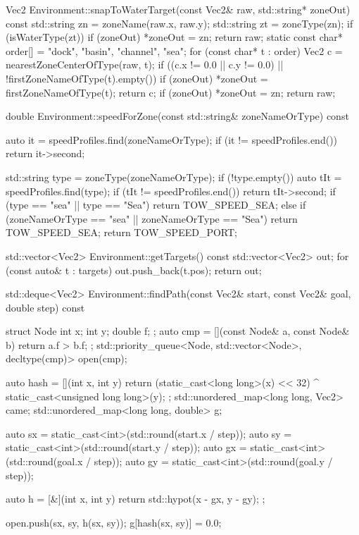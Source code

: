 \documentclass[10pt,letterpaper]{jsarticle}
\begin{document}
\begin{cppcode}
Vec2 Environment::snapToWaterTarget(const Vec2& raw, std::string* zoneOut) const {
    std::string zn = zoneName(raw.x, raw.y);
    std::string zt = zoneType(zn);
    if (isWaterType(zt)) {
        if (zoneOut) *zoneOut = zn;
        return raw;
    }
    static const char* order[] = {"dock", "basin", "channel", "sea"};
    for (const char* t : order) {
        Vec2 c = nearestZoneCenterOfType(raw, t);
        if ((c.x != 0.0 || c.y != 0.0) || !firstZoneNameOfType(t).empty()) {
            if (zoneOut) *zoneOut = firstZoneNameOfType(t);
            return c;
        }
    }
    if (zoneOut) *zoneOut = zn;
    return raw;
}

double Environment::speedForZone(const std::string& zoneNameOrType) const {
    auto it = speedProfiles.find(zoneNameOrType);
    if (it != speedProfiles.end()) return it->second;

    std::string type = zoneType(zoneNameOrType);
    if (!type.empty()) {
        auto tIt = speedProfiles.find(type);
        if (tIt != speedProfiles.end()) return tIt->second;
        if (type == "sea" || type == "Sea") return TOW_SPEED_SEA;
    } else if (zoneNameOrType == "sea" || zoneNameOrType == "Sea") {
        return TOW_SPEED_SEA;
    }
    return TOW_SPEED_PORT;
}

std::vector<Vec2> Environment::getTargets() const {
    std::vector<Vec2> out;
    for (const auto& t : targets) {
        out.push_back(t.pos);
    }
    return out;
}

std::deque<Vec2> Environment::findPath(const Vec2& start, const Vec2& goal, double step) const {
    struct Node {
        int x;
        int y;
        double f;
    };
    auto cmp = [](const Node& a, const Node& b) { return a.f > b.f; };
    std::priority_queue<Node, std::vector<Node>, decltype(cmp)> open(cmp);

    auto hash = [](int x, int y) {
        return (static_cast<long long>(x) << 32) ^ static_cast<unsigned long long>(y);
    };
    std::unordered_map<long long, Vec2> came;
    std::unordered_map<long long, double> g;

    auto sx = static_cast<int>(std::round(start.x / step));
    auto sy = static_cast<int>(std::round(start.y / step));
    auto gx = static_cast<int>(std::round(goal.x / step));
    auto gy = static_cast<int>(std::round(goal.y / step));

    auto h = [&](int x, int y) {
        return std::hypot(x - gx, y - gy);
    };

    open.push({sx, sy, h(sx, sy)});
    g[hash(sx, sy)] = 0.0;

}
\end{cppcode}
\end{document}

